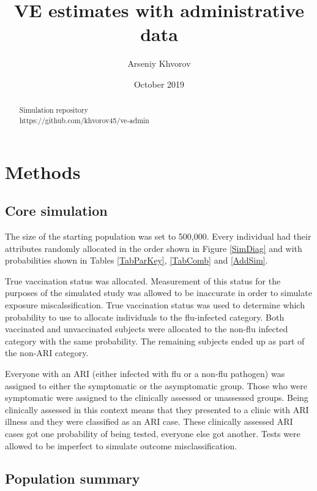 \documentclass[11pt]{article}
\title{VE estimates with administrative data}
\author{Arseniy Khvorov}
\date{October 2019}
\begin{document}
\maketitle

\renewcommand{\abstractname}{}
\begin{abstract}
	\begin{center}
	Simulation repository\\
	https://github.com/khvorov45/ve-admin
	\end{center}
\end{abstract}

\tableofcontents

\pagebreak

%
\section{Methods}

\subsection{Core simulation}

The size of the starting population was set to 500,000. Every individual had their attributes randomly allocated in the order shown in Figure \ref{SimDiag} and with probabilities shown in Tables \ref{TabParKey}, \ref{TabComb} and \ref{AddSim}.

True vaccination status was allocated. Measurement of this status for the purposes of the simulated study was allowed to be inaccurate in order to simulate exposure miscalssification. True vaccination status was used to determine which probability to use to allocate individuals to the flu-infected category. Both vaccinated and unvaccinated subjects were allocated to the non-flu infected category with the same probability. The remaining subjects ended up as part of the non-ARI category.

Everyone with an ARI (either infected with flu or a non-flu pathogen) was assigned to either the symptomatic or the asymptomatic group. Those who were symptomatic were assigned to the clinically assessed or unassessed groups. Being clinically assessed in this context means that they presented to a clinic with ARI illness and they were classified as an ARI case. These clinically assessed ARI cases got one probability of being tested, everyone else got another. Tests were allowed to be imperfect to simulate outcome misclassification.

\subsection{Population summary}
\end{document}
